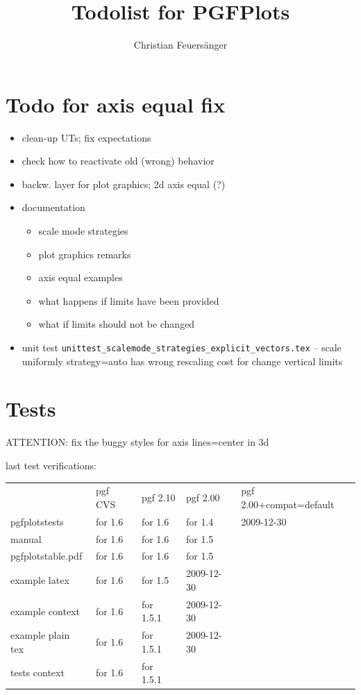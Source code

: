 \documentclass[a4paper]{article}
\author{Christian Feuers\"anger}
\title{Todolist for PGFPlots\\\texttt{\small\pgfplotscommandtostring\pgfplotsrevision\temp\temp}}
\begin{document}
\maketitle
\tableofcontents
\section{Todo for axis equal fix}

\begin{itemize}
	\item clean-up UTs; fix expectations
	\item check how to reactivate old (wrong) behavior
	\item backw. layer for plot graphics; 2d axis equal (?)
	\item documentation
		\begin{itemize}
			\item scale mode strategies
			\item plot graphics remarks
			\item axis equal examples
			\item what happens if limits have been provided
			\item what if limits should not be changed
		\end{itemize}
	\item unit test \verb|unittest_scalemode_strategies_explicit_vectors.tex| -- scale uniformly strategy=auto has wrong rescaling cost for change vertical limits
\end{itemize}

\section{Tests}

ATTENTION: fix the buggy styles for axis lines=center in 3d

last test verifications:

\begin{tabular}{lllll}
					&	pgf	CVS	&	pgf 2.10	& pgf	2.00	&pgf 2.00+compat=default\\
pgfplotstests		&	for 1.6	&	for 1.6		& for 1.4		&2009-12-30					\\
manual				&	for 1.6	&	for 1.6		& for 1.5		&	\\
pgfplotstable.pdf	&	for 1.6	&	for 1.6		& for 1.5\\
example	latex		&	for 1.6	&	for 1.5     & 2009-12-30					\\
example	context		&	for 1.6	&	for 1.5.1     & 2009-12-30				\\
example	plain tex	&	for 1.6	&	for 1.5.1     & 2009-12-30				\\
tests context		&	for 1.6	&   for 1.5.1\\
\end{tabular}
\end{document}
